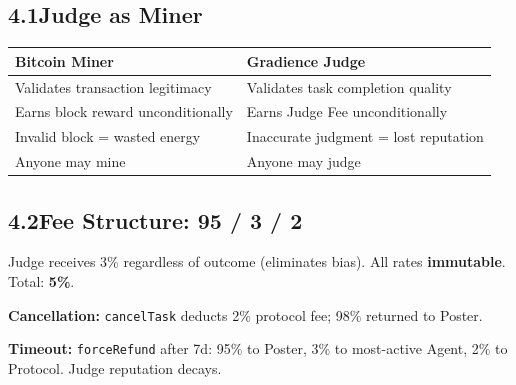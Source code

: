 \documentclass[11pt,a4paper]{article}
\begin{document}
\subsection{4.1\quad Judge as Miner}

\begin{table}[H]\centering
\begin{tabular}{@{}ll@{}}
\toprule
\textbf{Bitcoin Miner} & \textbf{Gradience Judge} \\
\midrule
Validates transaction legitimacy & Validates task completion quality \\
Earns block reward unconditionally & Earns Judge Fee unconditionally \\
Invalid block = wasted energy & Inaccurate judgment = lost reputation \\
Anyone may mine & Anyone may judge \\
\bottomrule
\end{tabular}
\end{table}

\subsection{4.2\quad Fee Structure: 95 / 3 / 2}

\begin{center}
\end{center}

Judge receives 3\% regardless of outcome (eliminates bias). All rates \textbf{immutable}. Total: \textbf{5\%}.

\textbf{Cancellation:} \texttt{cancelTask} deducts 2\% protocol fee; 98\% returned to Poster.

\textbf{Timeout:} \texttt{forceRefund} after 7d: 95\% to Poster, 3\% to most-active Agent, 2\% to Protocol. Judge reputation decays.
\end{document}
